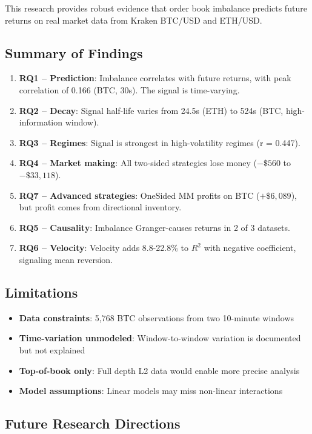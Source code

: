 \documentclass[12pt,a4paper]{article}
\begin{document}
This research provides robust evidence that order book imbalance predicts future returns on real market data from Kraken BTC/USD and ETH/USD.

\subsection{Summary of Findings}

\begin{enumerate}
    \item \textbf{RQ1 -- Prediction}: Imbalance correlates with future returns, with peak correlation of 0.166 (BTC, 30s). The signal is time-varying.
    \item \textbf{RQ2 -- Decay}: Signal half-life varies from 24.5s (ETH) to 524s (BTC, high-information window).
    \item \textbf{RQ3 -- Regimes}: Signal is strongest in high-volatility regimes (r = 0.447).
    \item \textbf{RQ4 -- Market making}: All two-sided strategies lose money ($-\$560$ to $-\$33,118$).
    \item \textbf{RQ7 -- Advanced strategies}: OneSided MM profits on BTC ($+\$6,089$), but profit comes from directional inventory.
    \item \textbf{RQ5 -- Causality}: Imbalance Granger-causes returns in 2 of 3 datasets.
    \item \textbf{RQ6 -- Velocity}: Velocity adds 8.8-22.8\% to $R^2$ with negative coefficient, signaling mean reversion.
\end{enumerate}

\subsection{Limitations}

\begin{itemize}
    \item \textbf{Data constraints}: 5,768 BTC observations from two 10-minute windows
    \item \textbf{Time-variation unmodeled}: Window-to-window variation is documented but not explained
    \item \textbf{Top-of-book only}: Full depth L2 data would enable more precise analysis
    \item \textbf{Model assumptions}: Linear models may miss non-linear interactions
\end{itemize}

\subsection{Future Research Directions}
\end{document}
